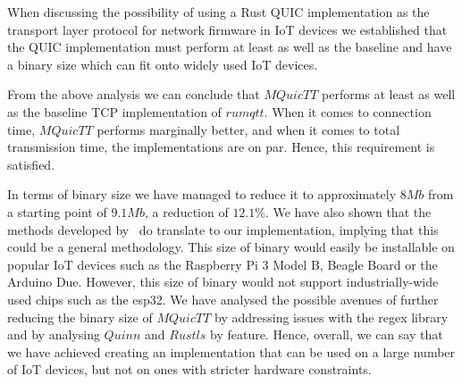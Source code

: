 When discussing the possibility of using a Rust QUIC implementation as the transport layer protocol for network firmware in IoT devices we established that the QUIC implementation must perform at least as well as the baseline and have a binary size which can fit onto widely used IoT devices.

From the above analysis we can conclude that $MQuicTT$ performs at least as well as the baseline TCP implementation of $rumqtt$.
When it comes to connection time, $MQuicTT$ performs marginally better, and when it comes to total transmission time, the implementations are on par.
Hence, this requirement is satisfied.

In terms of binary size we have managed to reduce it to approximately $8Mb$ from a starting point of $9.1Mb$, a reduction of $12.1\%$.
We have also shown that the methods developed by~\citet{eggert_towards_2020} do translate to our implementation, implying that this could be a general methodology.
This size of binary would easily be installable on popular IoT devices such as the Raspberry Pi 3 Model B, Beagle Board or the Arduino Due.
However, this size of binary would not support industrially-wide used chips such as the esp32.
We have analysed the possible avenues of further reducing the binary size of $MQuicTT$ by addressing issues with the regex library and by analysing $Quinn$ and $Rustls$ by feature.
Hence, overall, we can say that we have achieved creating an implementation that can be used on a large number of IoT devices, but not on ones with stricter hardware constraints.
